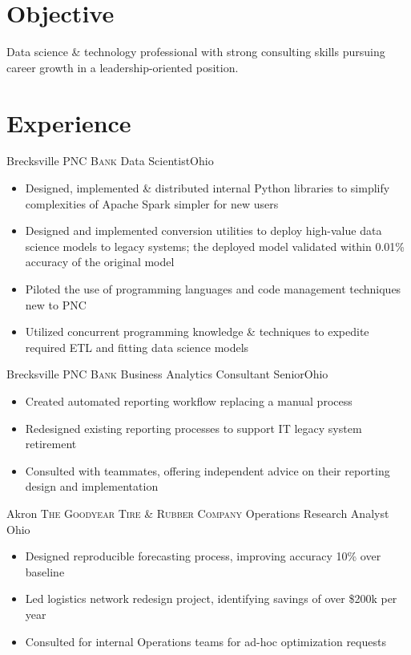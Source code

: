 \documentclass[letterpaper,12pt,color,final]{moderncv}
\begin{document}
\makecvtitle

\section{Objective}


Data science \& technology professional with strong consulting skills pursuing career growth in a leadership-oriented position.

\section{Experience}

{Brecksville}
{\textsc{PNC Bank}}
{Data Scientist}{Ohio}
{\begin{itemize}
  \item Designed, implemented \& distributed internal Python libraries to simplify complexities of Apache Spark simpler for new users
  \item Designed and implemented conversion utilities to deploy high-value data science models to legacy systems; the deployed model validated within 0.01\% accuracy of the original model
  \item Piloted the use of programming languages and code management techniques new to PNC
  \item Utilized concurrent programming knowledge \& techniques to expedite required ETL and fitting data science models
 \end{itemize}}

{Brecksville}
{\textsc{PNC Bank}}
{Business Analytics Consultant Senior}{Ohio}
{\begin{itemize}
  \item Created automated reporting workflow replacing a manual process
  \item Redesigned existing reporting processes to support IT legacy system retirement
  \item Consulted with teammates, offering independent advice on their reporting design and implementation
 \end{itemize}}

{Akron}
{\textsc{The Goodyear Tire \& Rubber Company}}
{Operations Research Analyst}
{Ohio}
{\begin{itemize}
  \item Designed reproducible forecasting process, improving accuracy 10\% over baseline
  \item Led logistics network redesign project, identifying savings of over \$200k per year
  \item Consulted for internal Operations teams for ad-hoc optimization requests
 \end{itemize}}
\end{document}
